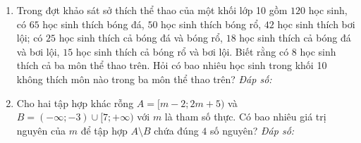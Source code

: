 \documentclass[12pt,a4paper]{article}
\newcommand{\answerbox}{\hfill\textit{Đáp số:}\ \fbox{\rule{0pt}{9pt}\hspace{2.2cm}}}
\begin{document}
\begin{enumerate}[resume]
\item Trong đợt khảo sát sở thích thể thao của một khối lớp 10 gồm $120$ học sinh, có $65$ học sinh thích bóng đá, $50$ học sinh thích bóng rổ, $42$ học sinh thích bơi lội; có $25$ học sinh thích cả bóng đá và bóng rổ, $18$ học sinh thích cả bóng đá và bơi lội, $15$ học sinh thích cả bóng rổ và bơi lội. Biết rằng có $8$ học sinh thích cả ba môn thể thao trên. Hỏi có bao nhiêu học sinh trong khối 10 không thích môn nào trong ba môn thể thao trên?
\answerbox

\item Cho hai tập hợp khác rỗng $A = [m - 2; 2m + 5)$ và $B = (-\infty; -3) \cup [7; +\infty)$ với $m$ là tham số thực. Có bao nhiêu giá trị nguyên của $m$ để tập hợp $A \setminus B$ chứa đúng $4$ số nguyên?
\answerbox
\end{enumerate}
\end{document}
